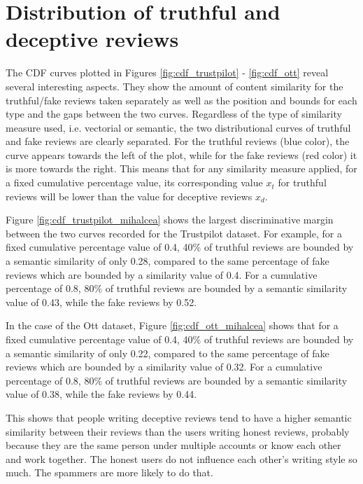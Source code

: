 \clearpage 

\section{Distribution of truthful and deceptive reviews}

The CDF curves plotted in Figures \ref{fig:cdf_trustpilot} - \ref{fig:cdf_ott} reveal several interesting aspects. They show the amount of content similarity for the truthful/fake reviews taken separately as well as the position and bounds for each type and the gaps between the two curves. Regardless of the type of similarity measure used, i.e. vectorial or semantic, the two distributional curves of truthful and fake reviews are clearly separated. For the truthful reviews (blue color), the curve appears towards the left of the plot, while for the fake reviews (red color) it is more towards the right. This means that for any similarity measure applied, for a fixed cumulative percentage value, its corresponding value \textit{$x_t$} for truthful reviews will be lower than the value for deceptive reviews \textit{$x_d$}. 

Figure \ref{fig:cdf_trustpilot_mihalcea} shows the largest discriminative margin between the two curves recorded for the Trustpilot dataset. For example, for a fixed cumulative percentage value of 0.4, 40\% of truthful reviews are bounded by a semantic similarity of only 0.28, compared to the same percentage of fake reviews which are bounded by a similarity value of 0.4. For a cumulative percentage of 0.8, 80\% of truthful reviews are bounded by a semantic similarity value of 0.43, while the fake reviews by 0.52. 

In the case of the Ott dataset, Figure \ref{fig:cdf_ott_mihalcea} shows that for a fixed cumulative percentage value of 0.4, 40\% of truthful reviews are bounded by a semantic similarity of only 0.22, compared to the same percentage of fake reviews which are bounded by a similarity value of 0.32. For a cumulative percentage of 0.8, 80\% of truthful reviews are bounded by a semantic similarity value of 0.38, while the fake reviews by 0.44. 

This shows that people writing deceptive reviews tend to have a higher semantic similarity between their reviews than the users writing honest reviews, probably because they are the same person under multiple accounts or know each other and work together. The honest users do not influence each other's writing style so much. The spammers are more likely to do that.

